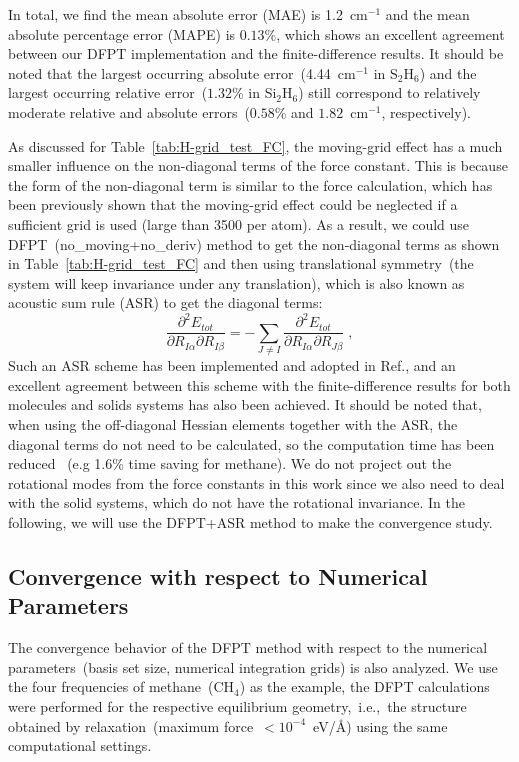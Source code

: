 \documentclass[journal=jpca,manuscript=article]{achemso}
\begin{document}
In total, we find the  mean absolute error (MAE) is 1.2~cm$^{-1}$ and the mean absolute percentage error (MAPE) is $0.13$\%, which shows an excellent agreement between our DFPT implementation and the finite-difference results.
It should be noted that the largest occurring absolute error~(4.44~cm$^{-1}$ in S$_2$H$_6$) and the largest occurring relative error~($1.32$\% in Si$_2$H$_6$) still correspond to relatively moderate relative and absolute errors~($0.58$\% and $1.82$~cm$^{-1}$, respectively). 

As discussed for Table~\ref{tab:H-grid_test_FC}, the moving-grid effect has a much smaller influence on the non-diagonal terms of the force constant. This is because the form of the non-diagonal term is similar to the force calculation, which has been previously shown\cite{Baker1994} that the moving-grid effect could be neglected if a sufficient grid is used (large than 3500 per atom). As a result, we could use DFPT~(no\_moving+no\_deriv) method to get the non-diagonal terms as shown in Table~\ref{tab:H-grid_test_FC} and then using translational symmetry~(the system will keep invariance under any translation), which is also known as acoustic sum rule (ASR)\cite{Baroni-2001, Gonze1997-2,Deglmann2002} to get 
the diagonal terms:  
\begin{equation}
\dfrac{\partial^2 E_{tot}}{\partial R_{I\alpha} \partial R_{I\beta}}
=-\sum_{J\ne I}{\dfrac{\partial^2 E_{tot}}{\partial R_{I\alpha} \partial R_{J\beta}}  }\;,
\end{equation}
Such an ASR scheme has been implemented and adopted in Ref.\cite{Shang2017}, and an excellent agreement between this scheme with the finite-difference results for both molecules and solids systems has also been achieved\cite{Shang2017}. It should be noted that, when using the off-diagonal Hessian elements together with the ASR, the diagonal terms do not need to be calculated, so the computation time has been reduced ~(e.g 1.6\% time saving for  methane). We do not project out the rotational modes
from the force constants in this work since we also need to deal with the solid systems, which do not have the rotational invariance. In the following, we will use the DFPT+ASR method to make the convergence study.


\subsection{Convergence with respect to Numerical Parameters}
\label{subsec:convergence}
The convergence behavior of the DFPT method with respect to the numerical
parameters~(basis set size, numerical integration grids) is also analyzed. 
We use the four frequencies of methane~(CH$_4$) as the example, the DFPT calculations were performed for the respective equilibrium geometry,~i.e.,~the structure obtained by relaxation~(maximum force~$<10^{-4}$~eV/$\mbox{\AA}$) using the same computational settings. 
\end{document}
